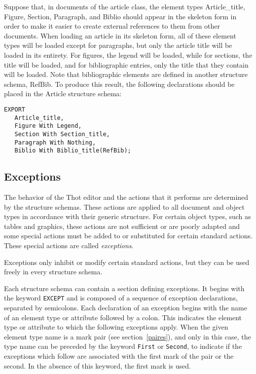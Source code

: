 \begin{example}
Suppose that, in documents of the article class, the element types
Article\_title, Figure, Section, Paragraph, and Biblio should appear
in the skeleton form in order to make it easier to create external
references to them from other documents.  When loading an article in
its skeleton form, all of these element types will be loaded except
for paragraphs, but only the article title will be loaded in its
entirety.  For figures, the legend will be loaded, while for sections,
the title will be loaded, and for bibliographic entries, only the
title that they contain will be loaded.  Note that bibliographic
elements are defined in another structure schema, RefBib.  To produce
this result, the following declarations should be placed in the Article
structure schema:

\begin{verbatim}
EXPORT
   Article_title,
   Figure With Legend,
   Section With Section_title,
   Paragraph With Nothing,
   Biblio With Biblio_title(RefBib);
\end{verbatim}
\end{example}

\subsection{Exceptions}

The behavior of the Thot editor and the actions that it performs are
determined by the structure schemas.  These actions are applied to
all document and object types in accordance with their generic
structure.  For certain object types, such as tables and graphics,
these actions are not sufficient or are poorly adapted and some
special actions must be added to or substituted for certain standard
actions.  These special actions are called {\em exceptions}.

Exceptions only inhibit or modify
certain standard actions, but they can be used freely in every
structure schema.

Each structure schema can contain a section defining exceptions.  It
begins with the
keyword {\tt EXCEPT} and is composed of a sequence of exception
declarations, separated by semicolons.  Each declaration of an
exception begins with the name of an element type or attribute
followed by a colon.  This indicates the element type or
attribute to which the following exceptions apply.  When the given
element type name is a mark pair (see section~\ref{paires}), and only
in this case, the type name can be preceded by the keyword {\tt First}
or {\tt Second}, to indicate if the exceptions which follow are
associated with the first mark of the pair or the second.  In the
absence of this keyword, the first mark is used.

